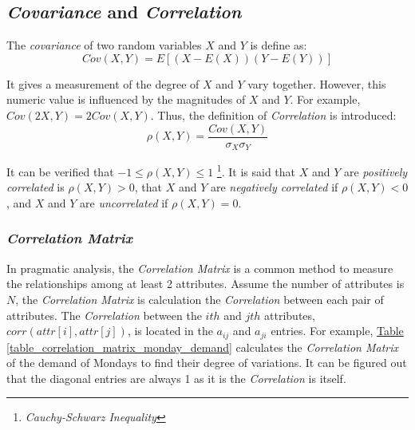 \documentclass[12pt,a4paper]{report}
\begin{document}
        \subsection{\emph{Covariance} and \emph{Correlation}}

        The \emph{covariance} of two random variables $X$ and $Y$ is define as:
        \begin{equation}
            Cov(X,Y)=E[(X-E(X))(Y-E(Y))]
        \end{equation}

        It gives a measurement of the degree of $X$ and $Y$ vary together. However, this numeric value is influenced by the magnitudes of $X$ and $Y$. For example, $Cov(2X,Y) = 2Cov(X,Y)$. Thus, the definition of \emph{Correlation} is introduced:
        \begin{equation}
            \rho(X,Y) = \frac{Cov(X,Y)}{\sigma_X \sigma_Y}
        \end{equation}

        It can be verified that $ -1 \leq \rho(X,Y) \leq 1 $ \footnote{\emph{Cauchy-Schwarz Inequality}}. It is said that $X$ and $Y$ are \emph{positively correlated} is $\rho(X,Y) > 0$, that $X$ and $Y$ are \emph{negatively correlated} if $\rho(X,Y) < 0$, and $X$ and $Y$ are \emph{uncorrelated} if $\rho(X,Y) = 0$.

        \subsubsection{\emph{Correlation Matrix}}
        In pragmatic analysis, the \emph{Correlation Matrix} is a common method to measure the relationships among at least 2 attributes. Assume the number of attributes is $N$, the \emph{Correlation Matrix} is calculation the \emph{Correlation} between each pair of attributes. The \emph{Correlation} between the $ith$ and $jth$ attributes, $corr(attr[i],attr[j])$, is located in the $a_{ij}$ and $a_{ji} $ entries. For example, \hyperref[table_correlation_matrix_monday_demand]{Table \ref*{table_correlation_matrix_monday_demand}} calculates the \emph{Correlation Matrix} of the demand of Mondays to find their degree of variations. It can be figured out that the diagonal entries are always 1 as it is the \emph{Correlation} is itself.
        
\end{document}
